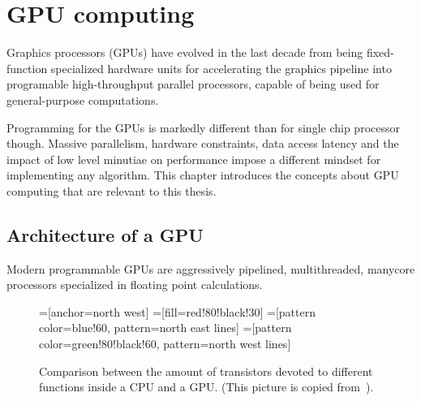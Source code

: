 \chapter{GPU computing}
\label{ch:gpu-computing}


Graphics processors (GPUs) have evolved in the last decade
from being fixed-function specialized hardware units
for accelerating the graphics pipeline
into programable high-throughput parallel processors,
capable of being used for general-purpose computations.

Programming for the GPUs is markedly different
than for single chip processor though.
Massive parallelism,
hardware constraints,
data access latency and
the impact of low level minutiae on performance
impose a different mindset for implementing any algorithm.
This chapter introduces the concepts
about GPU computing that are relevant to this thesis.

\section{Architecture of a GPU}

Modern programmable GPUs are aggressively pipelined,
multithreaded, manycore processors
specialized in floating point calculations.

\begin{figure}
  \label{fig:transistors}
  \centering
  =[anchor=north west]
  =[fill=red!80!black!30]
  =[pattern color=blue!60, pattern=north east lines]
  =[pattern color=green!80!black!60, pattern=north west lines]
  \caption[Comparison between CPU and GPU layout]{
    Comparison between the amount of transistors
    devoted to different functions inside a CPU and a GPU.
    (This picture is copied from~\cite[\S1]{cudaprog2}).
  }
\end{figure}

